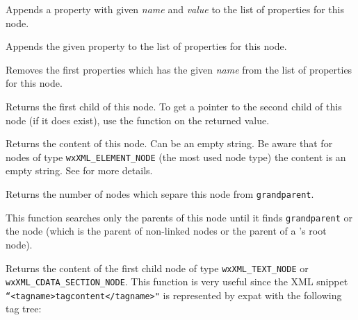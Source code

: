 Appends a property with given {\it name} and {\it value} to the list of properties for this node.


Appends the given property to the list of properties for this node.

\label{wxxmlnodedeleteproperty}


Removes the first properties which has the given {\it name} from the list of properties for this node.

\label{wxxmlnodegetchildren}


Returns the first child of this node.
To get a pointer to the second child of this node (if it does exist), use the
 function on the returned value.

\label{wxxmlnodegetcontent}


Returns the content of this node. Can be an empty string.
Be aware that for nodes of type \texttt{wxXML\_ELEMENT\_NODE} (the most used node type) the
content is an empty string. See  for more details.


\label{wxxmlnodegetdepth}


Returns the number of nodes which separe this node from {\tt grandparent}.

This function searches only the parents of this node until it finds {\tt grandparent}
or the \NULL node (which is the parent of non-linked nodes or the parent of a
's root node).


\label{wxxmlnodegetnodecontent}


Returns the content of the first child node of type \texttt{wxXML\_TEXT\_NODE} or \texttt{wxXML\_CDATA\_SECTION\_NODE}.
This function is very useful since the XML snippet \texttt{``<tagname>tagcontent</tagname>"} is represented by
expat with the following tag tree:

